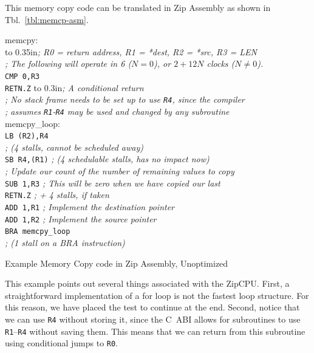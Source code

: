 \documentclass{gqtekspec}
\begin{document}
This memory copy code can be translated in Zip Assembly as shown in
Tbl.~\ref{tbl:memcp-asm}.
\begin{table}\begin{center}
\begin{tabbing}
memcpy: \\
\hbox to 0.35in{}\={\em ; R0 = return address, R1 = *dest, R2 = *src, R3 = LEN} \\
\>	{\em ; The following will operate in 6 ($N=0$), or $2+12N$ clocks ($N\neq 0$).} \\
\>	{\tt CMP 0,R3} \\ %
\>	{\tt RETN.Z} \hbox to 0.3in{}\= {\em ; A conditional return }\\
\>	{\em ; No stack frame needs to be set up to use {\tt R4}, since the compiler}\\
\>	{\em  ; assumes {\tt R1}-{\tt R4} may be used and changed by any subroutine} \\
memcpy\_loop: \\ %
\>	{\tt LB (R2),R4} \\
\>	{\em ; (4 stalls, cannot be scheduled away)} \\
\>	{\tt SB R4,(R1)} \> {\em ; (4 schedulable stalls, has no impact now)} \\
\>	{\em ; Update our count of the number of remaining values to copy}\\
\>	{\tt SUB 1,R3}	\> {\em ; This will be zero when we have copied our last}\\
\>	{\tt RETN.Z}	\> {\em ; + 4 stalls, if taken}\\
\>	{\tt ADD 1,R1}	\> {\em ; Implement the destination pointer }\\
\>	{\tt ADD 1,R2}	\> {\em ; Implement the source pointer }\\
\>	{\tt BRA memcpy\_loop} \\
\>	{\em ; (1 stall on a BRA instruction)} \\
\end{tabbing}
\caption{Example Memory Copy code in Zip Assembly, Unoptimized}\label{tbl:memcp-asm}
\end{center}\end{table}
This example points out several things associated with the ZipCPU.  First,
a straightforward implementation of a for loop is not the fastest loop
structure.  For this reason, we have placed the test to continue at the
end.  Second, notice that we can use {\tt R4} without storing it, since the
C~ABI allows for subroutines to use {\tt R1}--{\tt R4} without saving them. 
This means that we can return from this subroutine using conditional jumps to
{\tt R0}.
\end{document}
